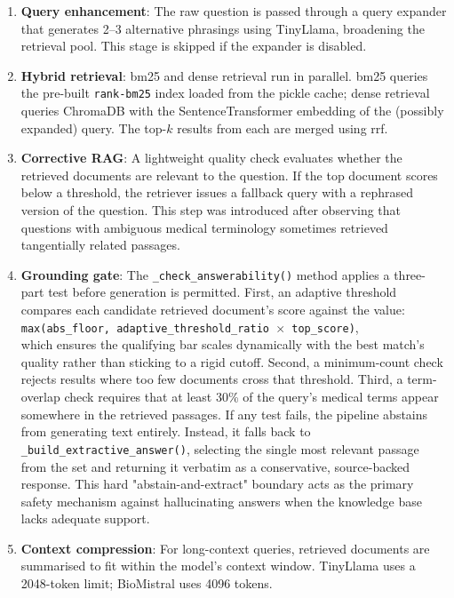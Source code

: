 \begin{enumerate}
    \item \textbf{Query enhancement}: The raw question is passed through a query expander that generates 2--3 alternative phrasings using TinyLlama, broadening the retrieval pool. This stage is skipped if the expander is disabled.
    \item \textbf{Hybrid retrieval}: \ac{bm25} and dense retrieval run in parallel. \ac{bm25} queries the pre-built \texttt{rank-bm25} index loaded from the pickle cache; dense retrieval queries ChromaDB with the SentenceTransformer embedding of the (possibly expanded) query. The top-$k$ results from each are merged using \ac{rrf}.
    \item \textbf{Corrective RAG}: A lightweight quality check evaluates whether the retrieved documents are relevant to the question. If the top document scores below a threshold, the retriever issues a fallback query with a rephrased version of the question. This step was introduced after observing that questions with ambiguous medical terminology sometimes retrieved tangentially related passages.
    \item \textbf{Grounding gate}: The \texttt{\_check\_answerability()} method applies a three-part test before generation is permitted. First, an adaptive threshold compares each candidate retrieved document's score against the value: \\ \texttt{max(abs\_floor,\allowbreak{} adaptive\_threshold\_ratio $\times$ top\_score)}, \\ which ensures the qualifying bar scales dynamically with the best match's quality rather than sticking to a rigid cutoff. Second, a minimum-count check rejects results where too few documents cross that threshold. Third, a term-overlap check requires that at least 30\% of the query's medical terms appear somewhere in the retrieved passages. If any test fails, the pipeline abstains from generating text entirely. Instead, it falls back to \texttt{\_build\_extractive\_answer()}, selecting the single most relevant passage from the set and returning it verbatim as a conservative, source-backed response. This hard "abstain-and-extract" boundary acts as the primary safety mechanism against hallucinating answers when the knowledge base lacks adequate support.
    \item \textbf{Context compression}: For long-context queries, retrieved documents are summarised to fit within the model's context window. TinyLlama uses a 2048-token limit; BioMistral uses 4096 tokens.

\end{enumerate}
